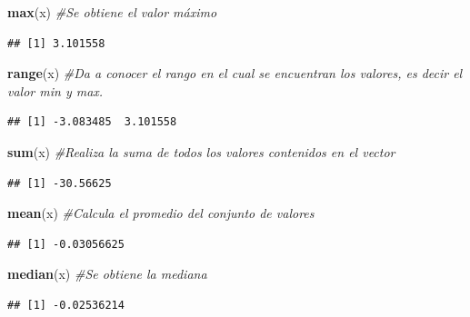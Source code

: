 \documentclass[
]{book}
\newenvironment{Shaded}{\begin{snugshade}}{\end{snugshade}}
\newcommand{\CommentTok}[1]{\textcolor[rgb]{0.56,0.35,0.01}{\textit{#1}}}
\newcommand{\FunctionTok}[1]{\textcolor[rgb]{0.13,0.29,0.53}{\textbf{#1}}}
\newcommand{\NormalTok}[1]{#1}
\begin{document}
\begin{Shaded}
\begin{Highlighting}[]
\FunctionTok{max}\NormalTok{(x) }\CommentTok{\#Se obtiene el valor máximo}
\end{Highlighting}
\end{Shaded}

\begin{verbatim}
## [1] 3.101558
\end{verbatim}

\begin{Shaded}
\begin{Highlighting}[]
\FunctionTok{range}\NormalTok{(x) }\CommentTok{\#Da a conocer el rango en el cual se encuentran los valores, es decir el valor min y max. }
\end{Highlighting}
\end{Shaded}

\begin{verbatim}
## [1] -3.083485  3.101558
\end{verbatim}

\begin{Shaded}
\begin{Highlighting}[]
\FunctionTok{sum}\NormalTok{(x) }\CommentTok{\#Realiza la suma de todos los valores contenidos en el vector }
\end{Highlighting}
\end{Shaded}

\begin{verbatim}
## [1] -30.56625
\end{verbatim}

\begin{Shaded}
\begin{Highlighting}[]
\FunctionTok{mean}\NormalTok{(x) }\CommentTok{\#Calcula el promedio del conjunto de valores }
\end{Highlighting}
\end{Shaded}

\begin{verbatim}
## [1] -0.03056625
\end{verbatim}

\begin{Shaded}
\begin{Highlighting}[]
\FunctionTok{median}\NormalTok{(x) }\CommentTok{\#Se obtiene la mediana }
\end{Highlighting}
\end{Shaded}

\begin{verbatim}
## [1] -0.02536214
\end{verbatim}
\end{document}
